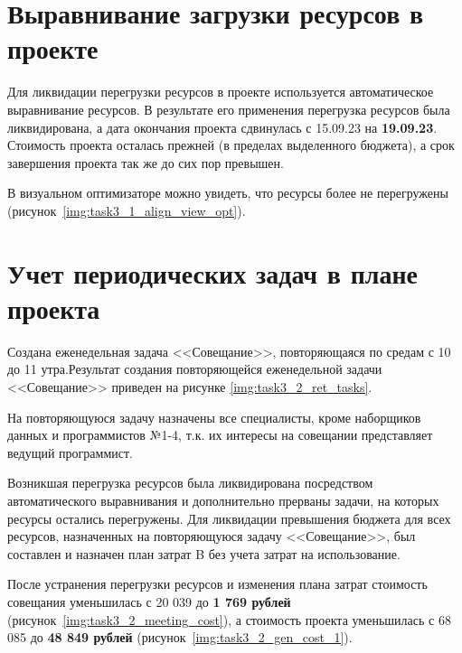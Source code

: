 \section{Выравнивание загрузки ресурсов в проекте}

Для ликвидации перегрузки ресурсов в проекте используется автоматическое выравнивание ресурсов.
В результате его применения перегрузка ресурсов была ликвидирована, а дата окончания проекта сдвинулась с 15.09.23 на \textbf{19.09.23}. Стоимость проекта осталась прежней (в пределах выделенного бюджета), а срок завершения проекта так же до сих пор превышен.


В визуальном оптимизаторе можно увидеть, что ресурсы более не перегружены (рисунок~\ref{img:task3_1_align_view_opt}).

\section{Учет периодических задач в плане проекта}

Создана еженедельная задача <<Совещание>>, повторяющаяся по средам с 10 до 11 утра.Результат создания повторяющейся еженедельной задачи <<Совещание>> приведен на рисунке \ref{img:task3_2_ret_tasks}.

На повторяющуюся задачу назначены все  специалисты, кроме 
наборщиков данных и программистов №1-4, т.к. их интересы на совещании 
представляет ведущий программист.

Возникшая перегрузка ресурсов была ликвидирована посредством автоматического выравнивания и дополнительно прерваны задачи, на которых ресурсы остались перегружены. Для ликвидации превышения бюджета для всех ресурсов, назначенных на повторяющуюся задачу <<Совещание>>, был составлен и назначен план затрат B без учета затрат на использование.

После устранения перегрузки ресурсов и изменения плана затрат стоимость совещания уменьшилась с 20 039 до \textbf{1 769 рублей} (рисунок~\ref{img:task3_2_meeting_cost}), а стоимость проекта уменьшилась с 68 085 до \textbf{48 849 рублей} (рисунок~\ref{img:task3_2_gen_cost_1}).

